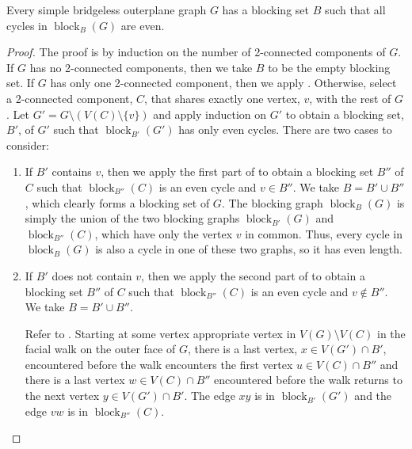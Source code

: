 \documentclass{patmorin}
\DeclareMathOperator{\block}{block}
\begin{document}
\begin{lem}
  Every simple bridgeless outerplane graph $G$ has a blocking set $B$
  such that all cycles in $\block_B(G)$ are even.
\end{lem}

\begin{proof}
  The proof is by induction on the number of 2-connected components
  of $G$.  If $G$ has no 2-connected components, then we take $B$ to be
  the empty blocking set.  If $G$ has only one 2-connected component,
  then we apply .
  Otherwise, select a 2-connected component, $C$, that
  shares exactly one vertex, $v$, with the rest of $G$.  Let
  $G'=G\setminus(V(C)\setminus\{v\})$ and apply induction on $G'$
  to obtain a blocking set, $B'$, of $G'$ such that $\block_{B'}(G')$
  has only even cycles.  There are two cases to consider:
  \begin{enumerate}
    \item If $B'$ contains $v$, then we apply the first part of
     to obtain a blocking set $B''$ of $C$
    such that $\block_{B''}(C)$ is an even cycle and $v\in B''$.  We take
    $B=B'\cup B''$, which clearly forms a blocking set of $G$.  
    The blocking graph $\block_B(G)$ is simply the union of the
    two blocking graphs $\block_{B'}(G)$ and $\block_{B''}(C)$, which have
    only the vertex $v$ in common.  Thus, every cycle in $\block_B(G)$
    is also a cycle in one of these two graphs, so it has even length.

    \item If $B'$ does not contain $v$, then we apply the second part
    of  to obtain a blocking set $B''$ of $C$
    such that $\block_{B''}(C)$ is an even cycle and $v\not\in B''$.
    We take $B=B'\cup B''$.

    Refer to .  
    Starting at some vertex appropriate vertex in $V(G)\setminus V(C)$
    in the facial walk on the outer face of $G$, there is a last vertex,
    $x\in V(G')\cap B'$, encountered before the walk encounters the first
    vertex $u\in V(C)\cap B''$ and there is a last vertex $w\in V(C)\cap
    B''$ encountered before the walk returns to the next vertex $y\in
    V(G')\cap B'$.  The edge $xy$ is in $\block_{B'}(G')$ and the edge
    $vw$ is in $\block_{B''}(C)$.


\end{enumerate}
\end{proof}
\end{document}
